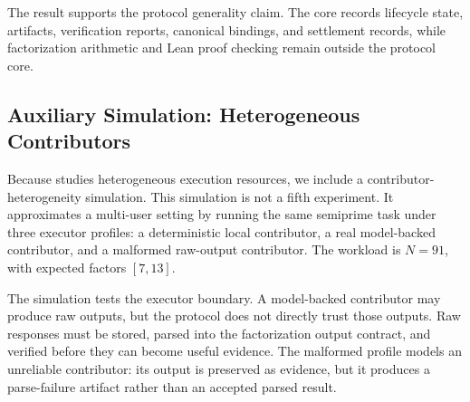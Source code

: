 \documentclass{article}
\theoremstyle{plain}
\begin{document}
The result supports the protocol generality claim. The core records lifecycle
state, artifacts, verification reports, canonical bindings, and settlement
records, while factorization arithmetic and Lean proof checking remain outside
the protocol core.

\FloatBarrier

\subsection{Auxiliary Simulation: Heterogeneous Contributors}
\label{subsec:aux-heterogeneous-contributors}

Because \TS{} studies heterogeneous execution resources, we include a contributor-
heterogeneity simulation. This simulation is not a fifth experiment. It
approximates a multi-user setting by running the same semiprime task under three
executor profiles: a deterministic local contributor, a real model-backed
contributor, and a malformed raw-output contributor. The workload is
\(N=91\), with expected factors \([7,13]\).

The simulation tests the executor boundary. A model-backed contributor may
produce raw outputs, but the protocol does not directly trust those outputs. Raw
responses must be stored, parsed into the factorization output contract, and
verified before they can become useful evidence. The malformed profile models an
unreliable contributor: its output is preserved as evidence, but it produces a
parse-failure artifact rather than an accepted parsed result.
\end{document}
